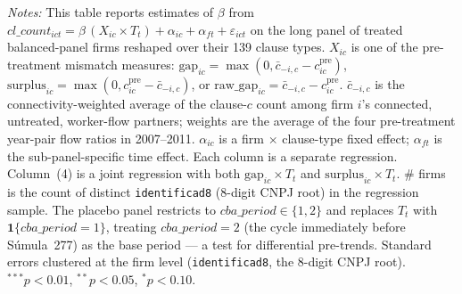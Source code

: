 \begin{table}[H]
\begin{minipage}{\linewidth}
\textit{Notes:} This table reports estimates of $\beta$ from $cl\_count_{ict} = \beta\,(X_{ic} \times T_t) + \alpha_{ic} + \alpha_{ft} + \varepsilon_{ict}$ on the long panel of treated balanced-panel firms reshaped over their 139 clause types. $X_{ic}$ is one of the pre-treatment mismatch measures: $\text{gap}_{ic} = \max(0, \bar{c}_{-i,c} - c^{\text{pre}}_{ic})$, $\text{surplus}_{ic} = \max(0, c^{\text{pre}}_{ic} - \bar{c}_{-i,c})$, or $\text{raw\_gap}_{ic} = \bar{c}_{-i,c} - c^{\text{pre}}_{ic}$. $\bar{c}_{-i,c}$ is the connectivity-weighted average of the clause-$c$ count among firm $i$'s connected, untreated, worker-flow partners; weights are the average of the four pre-treatment year-pair flow ratios in 2007--2011. $\alpha_{ic}$ is a firm $\times$ clause-type fixed effect; $\alpha_{ft}$ is the sub-panel-specific time effect. Each column is a separate regression. Column~(4) is a joint regression with both $\text{gap}_{ic} \times T_t$ and $\text{surplus}_{ic} \times T_t$. \# firms is the count of distinct \texttt{identificad8} (8-digit CNPJ root) in the regression sample. The placebo panel restricts to $cba\_period \in \{1, 2\}$ and replaces $T_t$ with $\mathbf{1}\{cba\_period = 1\}$, treating $cba\_period = 2$ (the cycle immediately before Súmula~277) as the base period — a test for differential pre-trends. Standard errors clustered at the firm level (\texttt{identificad8}, the 8-digit CNPJ root). $^{***}p<0.01$, $^{**}p<0.05$, $^{*}p<0.10$.
\end{minipage}
\end{table}
